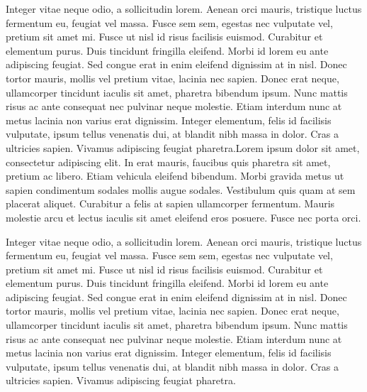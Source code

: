 Integer vitae neque odio, a sollicitudin lorem. Aenean orci mauris, tristique luctus fermentum eu, feugiat vel massa. Fusce sem sem, egestas nec vulputate vel, pretium sit amet mi. Fusce ut nisl id risus facilisis euismod. Curabitur et elementum purus. Duis tincidunt fringilla eleifend. Morbi id lorem eu ante adipiscing feugiat. Sed congue erat in enim eleifend dignissim at in nisl. Donec tortor mauris, mollis vel pretium vitae, lacinia nec sapien. Donec erat neque, ullamcorper tincidunt iaculis sit amet, pharetra bibendum ipsum. Nunc mattis risus ac ante consequat nec pulvinar neque molestie. Etiam interdum nunc at metus lacinia non varius erat dignissim. Integer elementum, felis id facilisis vulputate, ipsum tellus venenatis dui, at blandit nibh massa in dolor. Cras a ultricies sapien. Vivamus adipiscing feugiat pharetra.Lorem ipsum dolor sit amet, consectetur adipiscing elit. In erat mauris, faucibus quis pharetra sit amet, pretium ac libero. Etiam vehicula eleifend bibendum. Morbi gravida metus ut sapien condimentum sodales mollis augue sodales. Vestibulum quis quam at sem placerat aliquet. Curabitur a felis at sapien ullamcorper fermentum. Mauris molestie arcu et lectus iaculis sit amet eleifend eros posuere. Fusce nec porta orci.

Integer vitae neque odio, a sollicitudin lorem. Aenean orci mauris, tristique luctus fermentum eu, feugiat vel massa. Fusce sem sem, egestas nec vulputate vel, pretium sit amet mi. Fusce ut nisl id risus facilisis euismod. Curabitur et elementum purus. Duis tincidunt fringilla eleifend. Morbi id lorem eu ante adipiscing feugiat. Sed congue erat in enim eleifend dignissim at in nisl. Donec tortor mauris, mollis vel pretium vitae, lacinia nec sapien. Donec erat neque, ullamcorper tincidunt iaculis sit amet, pharetra bibendum ipsum. Nunc mattis risus ac ante consequat nec pulvinar neque molestie. Etiam interdum nunc at metus lacinia non varius erat dignissim. Integer elementum, felis id facilisis vulputate, ipsum tellus venenatis dui, at blandit nibh massa in dolor. Cras a ultricies sapien. Vivamus adipiscing feugiat pharetra.

